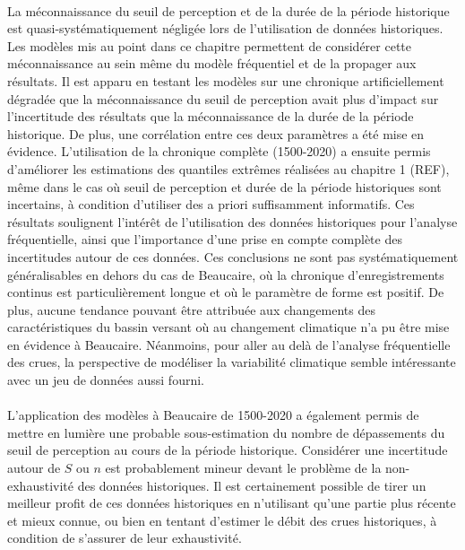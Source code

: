 \documentclass[11pt]{article}
\begin{document}
	\paragraph{} La méconnaissance du seuil de perception et de la durée de la période historique est quasi-systématiquement négligée lors de l'utilisation de données historiques. Les modèles mis au point dans ce chapitre permettent de considérer cette méconnaissance au sein même du modèle fréquentiel et de la propager aux résultats. Il est apparu en testant les modèles sur une chronique artificiellement dégradée que la méconnaissance du seuil de perception avait plus d'impact sur l'incertitude des résultats que la méconnaissance de la durée de la période historique. De plus, une corrélation entre ces deux paramètres a été mise en évidence. L'utilisation de la chronique complète (1500-2020) a ensuite permis d'améliorer les estimations des quantiles extrêmes réalisées au chapitre 1 (REF), même dans le cas où seuil de perception et durée de la période historiques sont incertains, à condition d'utiliser des a priori suffisamment informatifs. Ces résultats soulignent l'intérêt de l'utilisation des données historiques pour l'analyse fréquentielle, ainsi que l'importance d'une prise en compte complète des incertitudes autour de ces données. Ces conclusions ne sont pas systématiquement généralisables en dehors du cas de Beaucaire, où la chronique d'enregistrements continus est particulièrement longue et où le paramètre de forme est positif. De plus, aucune tendance pouvant être attribuée aux changements des caractéristiques du bassin versant où au changement climatique n'a pu être mise en évidence à Beaucaire. Néanmoins, pour aller au delà de l'analyse fréquentielle des crues, la perspective de modéliser la variabilité climatique semble intéressante avec un jeu de données aussi fourni.
	
	\paragraph{} L'application des modèles à Beaucaire de 1500-2020 a également permis de mettre en lumière une probable sous-estimation du nombre de dépassements du seuil de perception au cours de la période historique. Considérer une incertitude autour de $S$ ou $n$ est probablement mineur devant le problème de la non-exhaustivité des données historiques. Il est certainement possible de tirer un meilleur profit de ces données historiques en n'utilisant qu'une partie plus récente et mieux connue, ou bien en tentant d'estimer le débit des crues historiques, à condition de s'assurer de leur exhaustivité. 




\printbibliography[title=Bibliographie]
\end{document}
